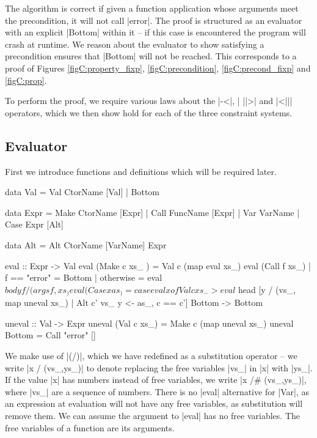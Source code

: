 \newcommand{\lemma}[1]{(\textit{#1})}
\newcommand{\theorem}[2]{#2 \hspace{5mm} \lemma{#1} \\}
\newcommand{\proof}[2][]{\paragraph{\lemma{#2} \textsf{#1}}}

The algorithm is correct if given a function application whose arguments meet the precondition, it will not call |error|. The proof is structured as an evaluator with an explicit |Bottom| within it -- if this case is encountered the program will crash at runtime. We reason about the evaluator to show satisfying a precondition ensures that |Bottom| will not be reached. This corresponds to a proof of Figures \ref{figC:property_fixp}, \ref{figC:precondition}, \ref{figC:precond_fixp} and \ref{figC:prop}.

To perform the proof, we require various laws about the |-<|, | ||>| and |<||| operators, which we then show hold for each of the three constraint systems.

\subsection{Evaluator}

First we introduce functions and definitions which will be required later.

\begin{code}
data Val  =  Val CtorName [Val]
          |  Bottom

data Expr  =  Make CtorName [Expr]
           |  Call FuncName [Expr]
           |  Var  VarName
           |  Case Expr [Alt]

data Alt = Alt CtorName [VarName] Expr

eval :: Expr -> Val
eval (Make c xs_   ) = Val c (map eval xs_)
eval (Call f xs_)  | f == "error" = Bottom
                   | otherwise = eval $ body f / (args f, xs_)
eval (Case x as_  ) = case eval x of
    Val c xs_ -> eval $ head [y / (vs_, map uneval xs_) | Alt c' vs_ y <- as_, c == c']
    Bottom -> Bottom

uneval :: Val -> Expr
uneval (Val c xs_)  = Make c (map uneval xs_)
uneval Bottom       = Call "error" []
\end{code}

We make use of |(/)|, which we have redefined as a substitution operator -- we write |x / (vs_,ys_)| to denote replacing the free variables |vs_| in |x| with |ys_|. If the value |x| has numbers instead of free variables, we write |x /# (vs_,ys_)|, where |vs_| are a sequence of numbers. There is no |eval| alternative for |Var|, as an expression at evaluation will not have any free variables, as substitution will remove them. We can assume the argument to |eval| has no free variables. The free variables of a function are its arguments.

